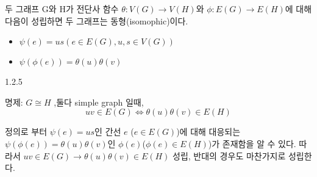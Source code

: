 \documentclass{oblivoir}
\begin{document}
\begin{thm}[isomophic] 두 그래프 G와 H가  전단사 함수 $\theta : V(G) \longrightarrow V(H)$와 $\phi : E(G) \rightarrow E(H)$에 대해 다음이 성립하면 두 그래프는 동형(isomophic)이다.
\begin{itemize}
    \item $\psi(e) = us( e \in E(G), u,s \in V(G)) $
    \item $\psi(\phi(e)) = \theta(u)\theta(v)$%
\end{itemize}
\end{thm}
1.2.5

명제: $G \cong H$ ,둘다 simple graph 일때, $$ uv \in E(G) \Longleftrightarrow  \theta(u)\theta(v) \in E(H)$$

정의로 부터 $\psi(e) = us$인 간선 $e$ ($e \in E(G)$)에 대해 대응되는 $\psi(\phi(e)) = \theta(u)\theta(v)$인 $\phi(e)$($\phi(e) \in E(H)$)가 존재함을 알 수 있다. 따라서 $ uv \in E(G) \rightarrow  \theta(u)\theta(v) \in E(H)$ 성립, 반대의 경우도 마찬가지로 성립한다.
\end{document}
